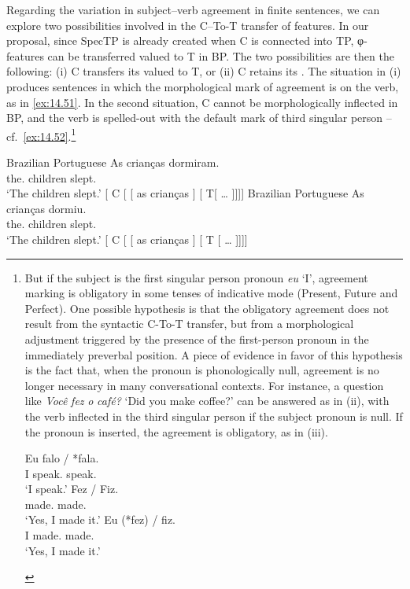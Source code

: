 \documentclass[output=paper]{langsci/langscibook}
\begin{document}
Regarding the variation in subject--verb agreement in finite sentences, we can explore two possibilities involved in
the C--To-T transfer of features. In our proposal, since SpecTP is already
created when C is connected into TP, φ-features can be transferred valued to T
in BP. The two possibilities are then the following: (i) C transfers its valued
 to T, or (ii) C retains its . The situation in
(i) produces sentences in which the morphological mark of agreement is on the
verb, as in \eqref{ex:14.51}.  In the second situation, C cannot be
morphologically inflected in BP, and the verb is spelled-out with the default
mark of third singular person -- cf.\ \eqref{ex:14.52}.\footnote{But if the
    subject is the first singular person pronoun \emph{eu} ‘I’, agreement
    marking is obligatory in some tenses of indicative mode (Present, Future
    and Perfect). One possible hypothesis is that the obligatory agreement does
    not result from the syntactic C-To-T transfer, but from a morphological
    adjustment triggered by the presence of the first-person pronoun in the
    immediately preverbal position. A piece of evidence in favor of this
    hypothesis is the fact that, when the pronoun is phonologically null,
    agreement is no longer necessary in many conversational contexts.  For
    instance, a question like \emph{Você} \emph{fez} \emph{o} \emph{café?} ‘Did
    you make coffee?’ can be answered as in (ii), with the verb inflected in
    the third singular person if the subject pronoun is null. If the pronoun is
    inserted, the agreement is obligatory, as in (iii).

    \begin{exe}
        \gll    Eu falo / *fala.\\
                I speak.\Fsg{} {} \hphantom{*}speak.\Tsg{}\\
        \glt    ‘I speak.’
        \gll    Fez / Fiz.\\
                made.\Tsg{} {} made.\Fsg{}\\
        \glt    ‘Yes, I made it.’
        \gll    Eu (*fez) / fiz.\\
                I \hphantom{(*}made.\Tsg{} {} made.\Fsg{}\\
        \glt    ‘Yes, I made it.’
    \end{exe}}\largerpage[2]

\ea%
    \label{ex:14.51}Brazilian Portuguese
	\ea
	\gll    As crianças dormiram.\\
            the.\Pl{} children slept.\Tpl{}\\
    \glt    ‘The children slept.’
    \ex
        {}[ C [ [ as crianças ]
            [ T[ \dots{} ]]]]
    \z
\ex%
    \label{ex:14.52}Brazilian Portuguese
	\ea
	\gll    As crianças dormiu.\\
            the.\Pl{} children slept.\Tsg{}\\
    \glt    ‘The children slept.’
    \ex
        {}[ C [ [ as crianças ]
            [ T\tss{} [ \dots{} ]]]]
    \z
\z
\end{document}
